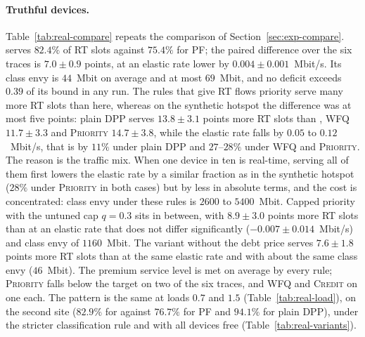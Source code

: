 \begin{table}[t]
\centering
\caption{Trace-driven scenario, site PW0127, load $1$: one elastic device declares video for its whole stay ($120$ devices on six traces).}
\label{tab:real-dev}
\resizebox{0.9\linewidth}{!}{}
\end{table}

\paragraph{Truthful devices.}
Table~\ref{tab:real-compare} repeats the comparison of Section~\ref{sec:exp-compare}.
\repay{} serves $82.4\%$ of RT slots against $75.4\%$ for \textsc{PF}; the paired difference over the six traces is $7.0\pm0.9$ points, at an elastic rate lower by $0.004\pm0.001$~Mbit/s.
Its class envy is $44$~Mbit on average and at most $69$~Mbit, and no deficit exceeds $0.39$ of its bound in any run.
The rules that give RT flows priority serve many more RT slots than \repay{} here, whereas on the synthetic hotspot the difference was at most five points: plain DPP serves $13.8\pm3.1$ points more RT slots than \repay{}, \textsc{WFQ} $11.7\pm3.3$ and \textsc{Priority} $14.7\pm3.8$, while the elastic rate falls by $0.05$ to $0.12$~Mbit/s, that is by $11\%$ under plain DPP and $27$--$28\%$ under \textsc{WFQ} and \textsc{Priority}.
The reason is the traffic mix. When one device in ten is real-time, serving all of them first lowers the elastic rate by a similar fraction as in the synthetic hotspot ($28\%$ under \textsc{Priority} in both cases) but by less in absolute terms, and the cost is concentrated: class envy under these rules is $2600$ to $5400$~Mbit.
Capped priority with the untuned cap $q=0.3$ sits in between, with $8.9\pm3.0$ points more RT slots than \repay{} at an elastic rate that does not differ significantly ($-0.007\pm0.014$~Mbit/s) and class envy of $1160$~Mbit.
The variant without the debt price serves $7.6\pm1.8$ points more RT slots than \repay{} at the same elastic rate and with about the same class envy ($46$~Mbit).
The premium service level is met on average by every rule; \textsc{Priority} falls below the target on two of the six traces, and \textsc{WFQ} and \textsc{Credit} on one each.
The pattern is the same at loads $0.7$ and $1.5$ (Table~\ref{tab:real-load}), on the second site ($82.9\%$ for \repay{} against $76.7\%$ for \textsc{PF} and $94.1\%$ for plain DPP), under the stricter classification rule and with all devices free (Table~\ref{tab:real-variants}).

